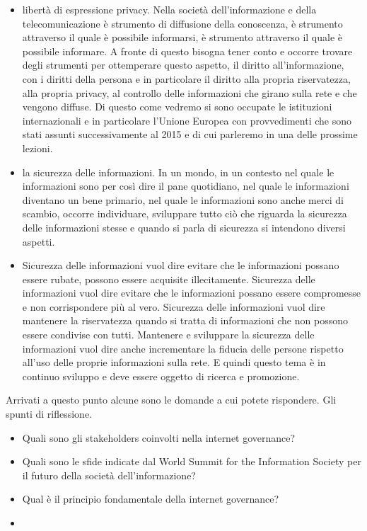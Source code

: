 \begin{itemize}
    \item libertà di espressione privacy. Nella società dell'informazione e della telecomunicazione è strumento di diffusione della conoscenza, è strumento attraverso il quale è possibile informarsi, è strumento attraverso il quale è possibile informare. A fronte di questo bisogna tener conto e occorre trovare degli strumenti per ottemperare questo aspetto, il diritto all'informazione, con i diritti della persona e in particolare il diritto alla propria riservatezza, alla propria privacy, al controllo delle informazioni che girano sulla rete e che vengono diffuse. Di questo come vedremo si sono occupate le istituzioni internazionali e in particolare l'Unione Europea con provvedimenti che sono stati assunti successivamente al 2015 e di cui parleremo in una delle prossime lezioni.
    \item la sicurezza delle informazioni. In un mondo, in un contesto nel quale le informazioni sono per così dire il pane quotidiano, nel quale le informazioni diventano un bene primario, nel quale le informazioni sono anche merci di scambio, occorre individuare, sviluppare tutto ciò che riguarda la sicurezza delle informazioni stesse e quando si parla di sicurezza si intendono diversi aspetti.
    \item  Sicurezza delle informazioni vuol dire evitare che le informazioni possano essere rubate, possono essere acquisite illecitamente. Sicurezza delle informazioni vuol dire evitare che le informazioni possano essere compromesse e non corrispondere più al vero. Sicurezza delle informazioni vuol dire mantenere la riservatezza quando si tratta di informazioni che non possono essere condivise con tutti. Mantenere e sviluppare la sicurezza delle informazioni vuol dire anche incrementare la fiducia delle persone rispetto all'uso delle proprie informazioni sulla rete. E quindi questo tema è in continuo sviluppo e deve essere oggetto di ricerca e promozione. 
\end{itemize}
 

 Arrivati a questo punto alcune sono le domande a cui potete rispondere. Gli spunti di riflessione. 
\begin{itemize}
    \item Quali sono gli stakeholders coinvolti nella internet governance?
    \item Quali sono le sfide indicate dal World Summit for the Information Society per il futuro della società dell'informazione?
    \item Qual è il principio fondamentale della internet governance?
    \item 
\end{itemize}
 